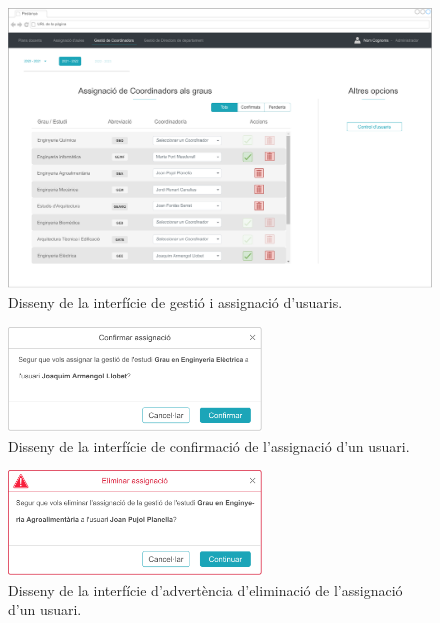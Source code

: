 \documentclass[a4paper,12pt]{ThesisStyle}
\begin{document}
\begin{figure}[H]
	\centering
	\includegraphics[width=\textwidth]{assets/interfaces/administradors/gestCoords/main.pdf}
	\caption{\label{img:gestCoords_main}Disseny de la interfície de gestió i assignació d'usuaris.}
\end{figure}

\begin{figure}[H]
	\centering
	\includegraphics[width=0.6\textwidth]{assets/interfaces/administradors/gestCoords/confirmarBox.pdf}
	\caption{\label{img:gestCoords_confirmarBox}Disseny de la interfície de confirmació de l'assignació d'un usuari.}
\end{figure}

\begin{figure}[H]
	\centering
	\includegraphics[width=0.6\textwidth]{assets/interfaces/administradors/gestCoords/confirmarEsborrarBox.pdf}
	\caption{\label{img:gestCoords_confirmarEsborrarBox}Disseny de la interfície d'advertència d'eliminació de l'assignació d'un usuari.}
\end{figure}
\end{document}
